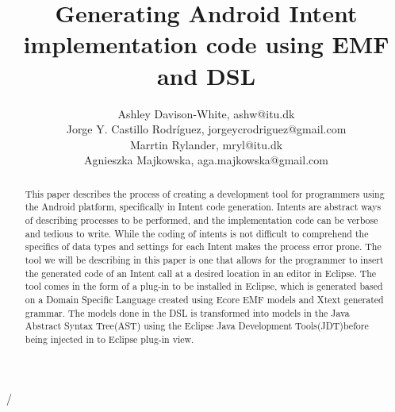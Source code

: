 \documentclass[12pt]{article}
\title{Generating Android Intent implementation code using EMF and DSL}
\author{Ashley Davison-White, ashw@itu.dk 
        \\Jorge Y. Castillo Rodríguez, jorgeycrodriguez@gmail.com
        \\Marrtin Rylander, mryl@itu.dk
        \\Agnieszka Majkowska, aga.majkowska@gmail.com
}
\begin{document}
\maketitle

\begin{abstract}
This paper describes the process of creating a development tool for programmers using the Android platform, specifically in Intent code generation.
Intents are abstract ways of describing processes to be performed, and the implementation code can be verbose and tedious to write. While the coding of intents is not difficult to comprehend the specifics of data types and settings for each Intent makes the process error prone. The tool we will be describing in this paper is one that allows for the programmer to insert the generated code of an Intent call at a desired location in an editor in Eclipse.
The tool comes in the form of a plug-in to be installed in Eclipse, which is generated based on a Domain Specific Language created using Ecore EMF models and Xtext generated grammar.
The models done in the DSL is transformed into models in the Java Abstract Syntax Tree(AST) using the Eclipse Java Development Tools(JDT)before being injected in to Eclipse plug-in view.   
\end{abstract}






















/%
\end{document}
